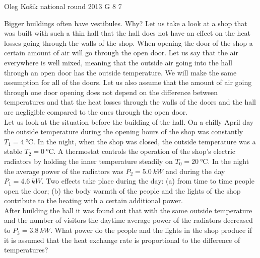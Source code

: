 \documentclass[11pt]{article}
\begin{document}
{Oleg Košik} %
{national round} %
{2013} %
{G 8} %
{7} %
{

\ifEngStatement
Bigger buildings often have vestibules. Why? Let us take a look at a shop that was built with such a thin hall that the hall does not have an effect on the heat losses going through the walls of the shop. When opening the door of the shop a certain amount of air will go through the open door. Let us say that the air everywhere is well mixed, meaning that the outside air going into the hall through an open door has the outside temperature. We will make the same assumption for all of the doors. Let us also assume that the amount of air going through one door opening does not depend on the difference between temperatures and that the heat losses through the walls of the doors and the hall are negligible compared to the ones through the open door.\\
Let us look at the situation before the building of the hall. On a chilly April day the outside temperature during the opening hours of the shop was constantly $T_1=\SI{4}{\celsius}$. In the night, when the shop was closed, the outside temperature was a stable $T_2=\SI{0}{\celsius}$. A thermostat controls the operation of the shop’s electric radiators by holding the inner temperature steadily on $T_0=\SI{20}{\celsius}$. In the night the average power of the radiators was $P_2= \SI{5,0}{kW}$ and during the day $P_1=\SI{4,6}{kW}$. Two effects take place during the day: (a) from time to time people open the door; (b) the body warmth of the people and the lights of the shop contribute to the heating with a certain additional power.\\
After building the hall it was found out that with the same outside temperature and the number of visitors the daytime average power of the radiators decreased to $P_3=\SI{3,8}{kW}$. What power do the people and the lights in the shop produce if it is assumed that the heat exchange rate is proportional to the difference of temperatures?
\fi
}
\end{document}
